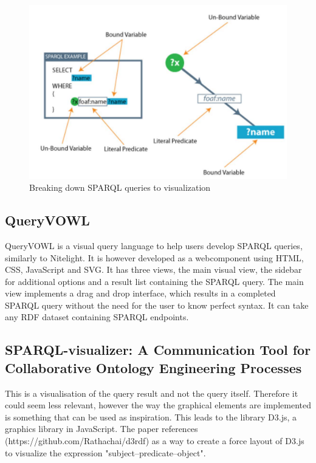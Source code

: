 \begin{figure}[h]
    \centering
  \includegraphics[width=.9\linewidth]{figures/NitelightFigure2.pdf}
  \caption{Breaking down SPARQL queries to visualization\cite{Nitelight}}
  \label{fig:NitelightBreakDown}
\end{figure}

\subsection{QueryVOWL}
QueryVOWL is a visual query language to help users develop SPARQL queries\cite{QueryVOWL}, similarly to Nitelight. It is however developed as a webcomponent using HTML, CSS, JavaScript and SVG. It has three views, the main visual view, the sidebar for additional options and a result list containing the SPARQL query. The main view implements a drag and drop interface, which results in a completed SPARQL query without the need for the user to know perfect syntax. It can take any RDF dataset containing SPARQL endpoints.

\subsection{SPARQL-visualizer: A Communication Tool for Collaborative Ontology Engineering Processes}
This is a visualisation of the query result\cite{MadsHoltenSPARQL} and not the query itself. Therefore it could seem less relevant, however the way the graphical elements are implemented is something that can be used as inspiration. This leads to the library D3.js, a graphics library in JavaScript. The paper references (https://github.com/Rathachai/d3rdf) as a way to create a force layout of D3.js to visualize the expression "subject–predicate–object".



